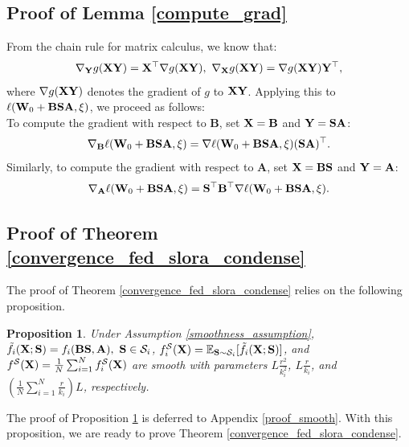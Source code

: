 \documentclass{article} %
\theoremstyle{plain}
\newtheorem{proposition}[theorem]{Proposition}
\theoremstyle{definition}
\begin{document}
\subsection{Proof of Lemma \ref{compute_grad}}\label{proof_compute_grad}
From the chain rule for matrix calculus, we know that: 
    \[\nabla_{\bf Y} g({\bf X}{\bf Y}) ={\bf X}^{\top} \nabla g({\bf X}{\bf Y}), ~\nabla_{\bf X} g({\bf X}{\bf Y}) =  \nabla g({\bf X} {\bf Y}){\bf Y}^{\top}, \]
    where \(\nabla g({\bf X} {\bf Y})\) denotes the gradient of \(g\) to \({\bf X} {\bf Y}\). Applying this to \(\ell({\bf W}_0 + {\bf B} {\bf S} {\bf A}, \xi)\), %
    we proceed as follows: \\
    To compute the gradient with respect to \(\mathbf{B}\), set \({\bf X} = \mathbf{B}\) and \({\bf Y} = \mathbf{S}\mathbf{A}\):
   \[
   \nabla_{\mathbf{B}} \ell({\bf W}_0 + {\bf BSA}, \xi) = \nabla \ell({\bf W}_0 + {\bf BSA}, \xi) (\mathbf{S}\mathbf{A})^\top.
   \]
   Similarly, to compute the gradient with respect to \(\mathbf{A}\), set \({\bf X} = \mathbf{B}\mathbf{S}\) and \({\bf Y} = \mathbf{A}\):
   \[
   \nabla_{\mathbf{A}} \ell({\bf W}_0 + {\bf BSA}, \xi) = \mathbf{S}^\top  \mathbf{B}^\top  \nabla \ell({\bf W}_0 + {\bf BSA}, \xi).
   \]


\subsection{Proof of Theorem \ref{convergence_fed_slora_condense}}\label{proof_theorem}
The proof of Theorem \ref{convergence_fed_slora_condense} relies on the following proposition. 
\begin{proposition}\label{smooth_derivation}
    Under Assumption \ref{smoothness_assumption}, \(\tilde{f}_{i} ({\bf X}; {\bf S}) = f_i({\bf B} {\bf S}, {\bf A}),~{\bf S} \in \mathcal{S}_i \), \(f_i^{\mathcal{S}}({\bf X}) = \mathbb{E}_{{\bf S} \sim \mathcal{S}_i} [\tilde{f}_{i} ({\bf X}; {\bf S}) ]\), and \(f^{\mathcal{S}} ({\bf X}) = \frac{1}{N} \sum_{i=1}^N f_i^{\mathcal{S}}(\mathbf{X})\) are smooth with parameters \(L \frac{r^2}{k_i^2}\), \(L \frac{r}{k_i}\), and \(\left( \frac{1}{N} \sum_{i=1}^N \frac{r}{k_i} \right) L \), respectively. 
\end{proposition}
The proof of Proposition \ref{smooth_derivation} is deferred to Appendix \ref{proof_smooth}. With this proposition, we are ready to prove Theorem \ref{convergence_fed_slora_condense}. 
\end{document}
